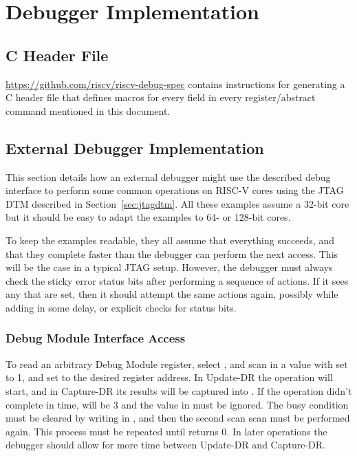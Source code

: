 \chapter{Debugger Implementation}

\section{C Header File}

\href{https://github.com/riscv/riscv-debug-spec}
{https://github.com/riscv/riscv-debug-spec} contains instructions for generating
a C header file that defines macros for every field in every register/abstract
command mentioned in this document.

\section{External Debugger Implementation}

This section details how an external debugger might use the described debug
interface to perform some common operations on RISC-V cores using the JTAG DTM
described in Section~\ref{sec:jtagdtm}.
All these examples assume a 32-bit core but it should be easy to adapt the
examples to 64- or 128-bit cores.

To keep the examples readable, they all assume that everything succeeds, and
that they complete faster than the debugger can perform the next access. This
will be the case in a typical JTAG setup. However, the debugger must always
check the sticky error status bits after performing a sequence of actions. If
it sees any that are set, then it should attempt the same actions again,
possibly while adding in some delay, or explicit checks for status bits.

\subsection{Debug Module Interface Access} \label{dmiaccess}

To read an arbitrary Debug Module register, select \RdtmDmi, and scan in a value
with \FdtmDmiOp set to 1, and \FdmSbaddressZeroAddress set to the desired register address. In
Update-DR the operation will start, and in Capture-DR its results will be
captured into \FdmSbdataZeroData.  If the operation didn't complete in time, \FdtmDmiOp will be 3
and the value in \FdmSbdataZeroData must be ignored. The busy condition must be cleared by
writing \FdtmDtmcsDmireset in \RdtmDtmcs, and then the second scan scan must be performed again.
This process must be repeated until \FdtmDmiOp returns 0.
In later operations the debugger should allow for more time between Update-DR and
Capture-DR.

